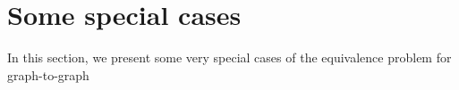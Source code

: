 \section{Some special cases}
In this section, we present some very special cases of the equivalence problem for graph-to-graph 